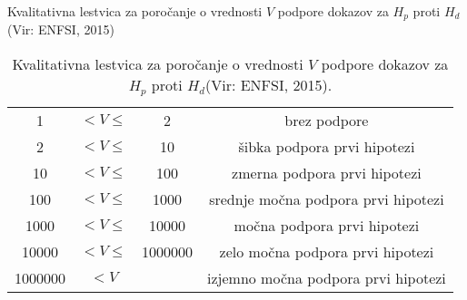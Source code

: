 \documentclass[12pt,a4paper]{amsart}
\theoremstyle{definition} %
\theoremstyle{plain} %
\begin{document}
Kvalitativna lestvica za poročanje o vrednosti $V$ podpore dokazov za $H_p$ proti $H_d$(Vir: ENFSI, 2015)
\begin{table}[h!]
    \centering
    \caption{Kvalitativna lestvica za poročanje o vrednosti $V$ podpore dokazov za $H_p$ proti $H_d$(Vir: ENFSI, 2015).}
    \label{table:1} 
     \begin{tabular}{c c c c}
     \hline 
     1 & $< V \le$  & 2 & brez podpore \\ 
     2 & $< V \le$ & 10 & šibka podpora prvi hipotezi \\ 
     10 & $< V \le$ & 100 & zmerna podpora prvi hipotezi \\
     100 & $< V \le$ & 1000 & srednje močna podpora prvi hipotezi \\
     1000 & $< V \le$ & 10000 & močna podpora prvi hipotezi \\
     10000 & $< V \le$ & 1000000 & zelo močna podpora prvi hipotezi \\ 
     1000000 & $< V $ & & izjemno močna podpora prvi hipotezi \\ [1ex] 
     \hline
     \end{tabular}
\end{table}
\end{document}
